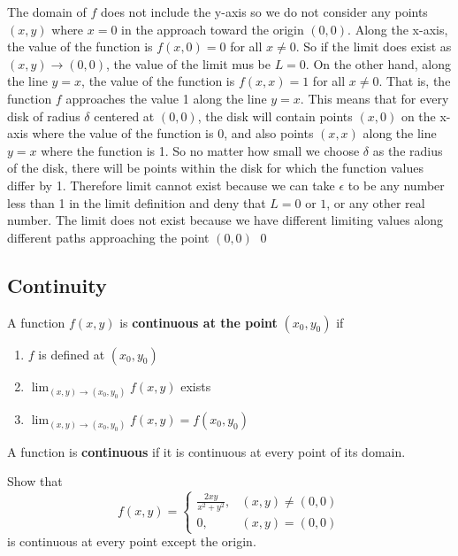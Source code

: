 \documentclass[12pt,a4paper]{article}
\newenvironment{definition}{\begin{definitionbox}}{\end{definitionbox}\vspace{1\baselineskip}}
\begin{document}
\begin{solution}
    The domain of \(f\) does not include the y-axis so we do not consider any points \((x,y)\) where \(x=0\) in the approach toward the origin \((0,0)\). Along the x-axis, the value of the function is \( f(x,0) = 0\) for all \(x \neq 0\).
    So if the limit does exist as \((x,y) \to (0,0)\), the value of the limit mus be \(L = 0\). On the other hand, along the line \(y=x\), the value of the function is \(f(x,x) = 1\) for all \(x \neq 0\).
    That is, the function \(f\) approaches the value 1 along the line \(y=x\). This means that for every disk of radius \(\delta\) centered at \((0,0)\), the disk will contain points \((x,0)\) on the x-axis where the value of the function is 0, and also points \((x,x)\) along the line \(y=x\) where the function is 1.
    So no matter how small we choose \(\delta\) as the radius of the disk, there will be points within the disk for which the function values differ by 1. Therefore limit cannot exist because we can take \(\epsilon\) to be any number less than 1 in the limit definition and deny that \(\mathit{L} = 0\) or \(1\), or any other real number.
    The limit does not exist because we have different limiting values along different paths approaching the point \((0,0)\) \hfill \qed

\end{solution}

\subsection{Continuity}

\begin{definition}
    A function \(f(x,y)\) is \textbf{continuous at the point} \((x_0,y_0)\) if
    \begin{enumerate}
        \item \(f\) is defined at \((x_0,y_0)\)
        \item \(\lim_{(x,y) \to (x_0,y_0)}f(x,y)\) exists
        \item \(\lim_{(x,y) \to (x_0,y_0)}f(x,y) = f(x_0,y_0)\) 
    \end{enumerate}
    A function is \textbf{continuous} if it is continuous at every point of its domain.
\end{definition}

\begin{example}
    Show that
    \[f(x, y)= \begin{cases}\frac{2 x y}{x^2+y^2}, & (x, y) \neq(0,0) \\ 0, & (x, y)=(0,0)\end{cases}\]
    is continuous at every point except the origin.
\end{example}
\end{document}

